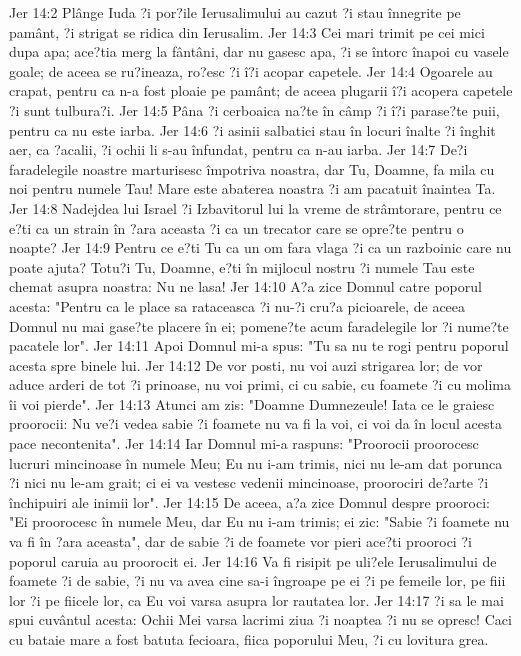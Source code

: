 Jer 14:2  Plânge Iuda ?i por?ile Ierusalimului au cazut ?i stau înnegrite pe pamânt, ?i strigat se ridica din Ierusalim.
Jer 14:3  Cei mari trimit pe cei mici dupa apa; ace?tia merg la fântâni, dar nu gasesc apa, ?i se întorc înapoi cu vasele goale; de aceea se ru?ineaza, ro?esc ?i î?i acopar capetele.
Jer 14:4  Ogoarele au crapat, pentru ca n-a fost ploaie pe pamânt; de aceea plugarii î?i acopera capetele ?i sunt tulbura?i.
Jer 14:5  Pâna ?i cerboaica na?te în câmp ?i î?i parase?te puii, pentru ca nu este iarba.
Jer 14:6  ?i asinii salbatici stau în locuri înalte ?i înghit aer, ca ?acalii, ?i ochii li s-au înfundat, pentru ca n-au iarba.
Jer 14:7  De?i faradelegile noastre marturisesc împotriva noastra, dar Tu, Doamne, fa mila cu noi pentru numele Tau! Mare este abaterea noastra ?i am pacatuit înaintea Ta.
Jer 14:8  Nadejdea lui Israel ?i Izbavitorul lui la vreme de strâmtorare, pentru ce e?ti ca un strain în ?ara aceasta ?i ca un trecator care se opre?te pentru o noapte?
Jer 14:9  Pentru ce e?ti Tu ca un om fara vlaga ?i ca un razboinic care nu poate ajuta? Totu?i Tu, Doamne, e?ti în mijlocul nostru ?i numele Tau este chemat asupra noastra: Nu ne lasa!
Jer 14:10  A?a zice Domnul catre poporul acesta: "Pentru ca le place sa rataceasca ?i nu-?i cru?a picioarele, de aceea Domnul nu mai gase?te placere în ei; pomene?te acum faradelegile lor ?i nume?te pacatele lor".
Jer 14:11  Apoi Domnul mi-a spus: "Tu sa nu te rogi pentru poporul acesta spre binele lui.
Jer 14:12  De vor posti, nu voi auzi strigarea lor; de vor aduce arderi de tot ?i prinoase, nu voi primi, ci cu sabie, cu foamete ?i cu molima îi voi pierde".
Jer 14:13  Atunci am zis: "Doamne Dumnezeule! Iata ce le graiesc proorocii: Nu ve?i vedea sabie ?i foamete nu va fi la voi, ci voi da în locul acesta pace necontenita".
Jer 14:14  Iar Domnul mi-a raspuns: "Proorocii proorocesc lucruri mincinoase în numele Meu; Eu nu i-am trimis, nici nu le-am dat porunca ?i nici nu le-am grait; ci ei va vestesc vedenii mincinoase, proorociri de?arte ?i închipuiri ale inimii lor".
Jer 14:15  De aceea, a?a zice Domnul despre prooroci: "Ei proorocesc în numele Meu, dar Eu nu i-am trimis; ei zic: "Sabie ?i foamete nu va fi în ?ara aceasta", dar de sabie ?i de foamete vor pieri ace?ti prooroci ?i poporul caruia au proorocit ei.
Jer 14:16  Va fi risipit pe uli?ele Ierusalimului de foamete ?i de sabie, ?i nu va avea cine sa-i îngroape pe ei ?i pe femeile lor, pe fiii lor ?i pe fiicele lor, ca Eu voi varsa asupra lor rautatea lor.
Jer 14:17  ?i sa le mai spui cuvântul acesta: Ochii Mei varsa lacrimi ziua ?i noaptea ?i nu se opresc! Caci cu bataie mare a fost batuta fecioara, fiica poporului Meu, ?i cu lovitura grea.
